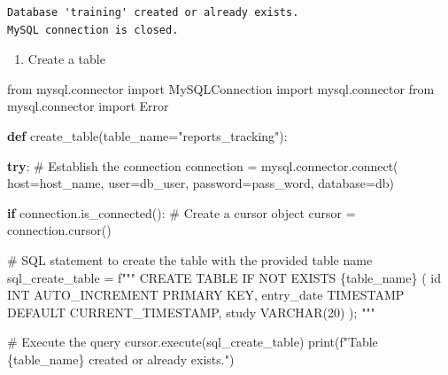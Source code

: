 \documentclass[
  letterpaper,
  DIV=11,
  numbers=noendperiod]{scrreprt}
\newenvironment{Shaded}{\begin{snugshade}}{\end{snugshade}}
\newcommand{\BuiltInTok}[1]{\textcolor[rgb]{0.00,0.23,0.31}{#1}}
\newcommand{\CommentTok}[1]{\textcolor[rgb]{0.37,0.37,0.37}{#1}}
\newcommand{\ControlFlowTok}[1]{\textcolor[rgb]{0.00,0.23,0.31}{\textbf{#1}}}
\newcommand{\ExtensionTok}[1]{\textcolor[rgb]{0.00,0.23,0.31}{#1}}
\newcommand{\ImportTok}[1]{\textcolor[rgb]{0.00,0.46,0.62}{#1}}
\newcommand{\KeywordTok}[1]{\textcolor[rgb]{0.00,0.23,0.31}{\textbf{#1}}}
\newcommand{\NormalTok}[1]{\textcolor[rgb]{0.00,0.23,0.31}{#1}}
\newcommand{\OperatorTok}[1]{\textcolor[rgb]{0.37,0.37,0.37}{#1}}
\newcommand{\SpecialCharTok}[1]{\textcolor[rgb]{0.37,0.37,0.37}{#1}}
\newcommand{\SpecialStringTok}[1]{\textcolor[rgb]{0.13,0.47,0.30}{#1}}
\newcommand{\StringTok}[1]{\textcolor[rgb]{0.13,0.47,0.30}{#1}}
\providecommand{\tightlist}{%
  \setlength{\itemsep}{0pt}\setlength{\parskip}{0pt}}\usepackage{longtable,booktabs,array}
\begin{document}
\begin{verbatim}
Database 'training' created or already exists.
MySQL connection is closed.
\end{verbatim}

\begin{enumerate}
\def\labelenumi{\arabic{enumi}.}
\setcounter{enumi}{2}
\tightlist
\item
  Create a table
\end{enumerate}

\begin{Shaded}
\begin{Highlighting}[]
\ImportTok{from}\NormalTok{ mysql.connector }\ImportTok{import}\NormalTok{ MySQLConnection}
\ImportTok{import}\NormalTok{ mysql.connector}
\ImportTok{from}\NormalTok{ mysql.connector }\ImportTok{import}\NormalTok{ Error}


\KeywordTok{def}\NormalTok{ create\_table(table\_name}\OperatorTok{=}\StringTok{"reports\_tracking"}\NormalTok{):}

    \ControlFlowTok{try}\NormalTok{:}
      \CommentTok{\# Establish the connection}
\NormalTok{      connection }\OperatorTok{=}\NormalTok{ mysql.connector.}\ExtensionTok{connect}\NormalTok{(}
\NormalTok{          host}\OperatorTok{=}\NormalTok{host\_name,}
\NormalTok{          user}\OperatorTok{=}\NormalTok{db\_user,}
\NormalTok{          password}\OperatorTok{=}\NormalTok{pass\_word,}
\NormalTok{          database}\OperatorTok{=}\NormalTok{db)}

      \ControlFlowTok{if}\NormalTok{ connection.is\_connected():}
          \CommentTok{\# Create a cursor object}
\NormalTok{          cursor }\OperatorTok{=}\NormalTok{ connection.cursor()}

          \CommentTok{\# SQL statement to create the table with the provided table name}
\NormalTok{          sql\_create\_table }\OperatorTok{=} \SpecialStringTok{f"""}
\SpecialStringTok{          CREATE TABLE IF NOT EXISTS }\SpecialCharTok{\{}\NormalTok{table\_name}\SpecialCharTok{\}}\SpecialStringTok{ (}
\SpecialStringTok{              id INT AUTO\_INCREMENT PRIMARY KEY,}
\SpecialStringTok{              entry\_date TIMESTAMP DEFAULT CURRENT\_TIMESTAMP,}
\SpecialStringTok{              study VARCHAR(20)}
\SpecialStringTok{          );}
\SpecialStringTok{          """}

          \CommentTok{\# Execute the query}
\NormalTok{          cursor.execute(sql\_create\_table)}
          \BuiltInTok{print}\NormalTok{(}\SpecialStringTok{f"Table \textquotesingle{}}\SpecialCharTok{\{}\NormalTok{table\_name}\SpecialCharTok{\}}\SpecialStringTok{\textquotesingle{} created or already exists."}\NormalTok{)}


\end{Highlighting}
\end{Shaded}
\end{document}
